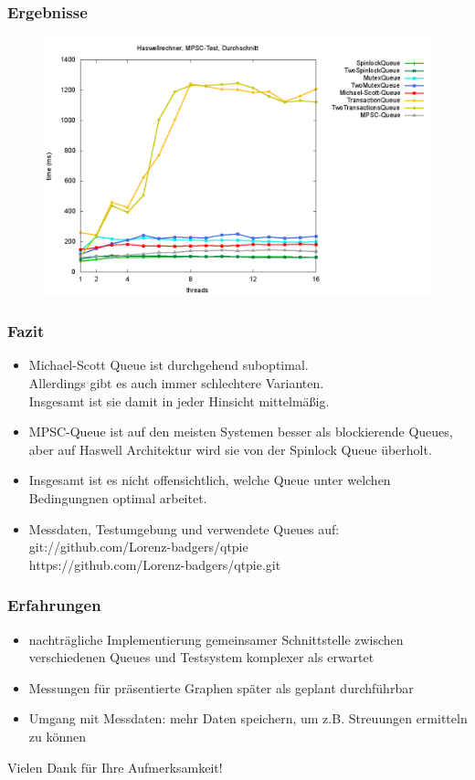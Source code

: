 \documentclass[svgnames]{beamer}
\begin{document}
\begin{frame}
\frametitle{Ergebnisse}
\begin {figure}
      \begin{center}
	\includegraphics[width=\textwidth]{fastboxsa.png}
     \end{center}
\end {figure}
\end{frame}



\begin{frame}
\frametitle{Fazit}
\begin{itemize}
\item Michael-Scott Queue ist durchgehend suboptimal.\\
	Allerdings gibt es auch immer schlechtere Varianten.\\
	Insgesamt ist sie damit in jeder Hinsicht mittelm\"a\ss{}ig.
\item MPSC-Queue ist auf den meisten Systemen besser als blockierende Queues,
	aber auf Haswell Architektur wird sie von der Spinlock Queue \"uberholt.
\item Insgesamt ist es nicht offensichtlich, welche Queue unter welchen Bedingungnen optimal arbeitet.
\item Messdaten, Testumgebung und verwendete Queues auf:\\
	git://github.com/Lorenz-badgers/qtpie \\
	https://github.com/Lorenz-badgers/qtpie.git
\end{itemize}
\end{frame}


\begin{frame}
\frametitle{Erfahrungen}
\begin{itemize}
\item nachtr\"agliche Implementierung gemeinsamer Schnittstelle zwischen verschiedenen Queues und Testsystem komplexer als erwartet
\item Messungen f\"ur pr\"asentierte Graphen sp\"ater als geplant durchf\"uhrbar
\item Umgang mit Messdaten: mehr Daten speichern, um z.B. Streuungen ermitteln zu k\"onnen
\end{itemize}
\end{frame}



\begin{frame}
\Large{\centerline{Vielen Dank f\"ur Ihre Aufmerksamkeit!}}
\end{frame}
\end{document}
